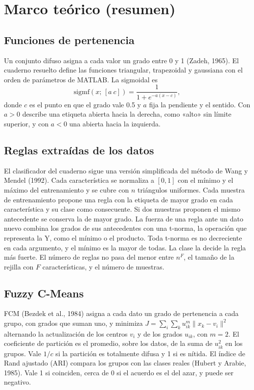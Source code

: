 \documentclass[11pt,letterpaper]{article}
\begin{document}
\section{Marco teórico (resumen)}

\subsection{Funciones de pertenencia}

Un conjunto difuso asigna a cada valor un grado entre 0 y 1 (Zadeh, 1965). El cuaderno resuelto define las funciones triangular, trapezoidal y gaussiana con el orden de parámetros de MATLAB. La sigmoidal es
\[
\mathrm{sigmf}(x;\,[a\ c]) = \frac{1}{1 + e^{-a(x-c)}},
\]
donde $c$ es el punto en que el grado vale 0.5 y $a$ fija la pendiente y el sentido. Con $a>0$ describe una etiqueta abierta hacia la derecha, como «alto» sin límite superior, y con $a<0$ una abierta hacia la izquierda.

\subsection{Reglas extraídas de los datos}

El clasificador del cuaderno sigue una versión simplificada del método de Wang y Mendel (1992). Cada característica se normaliza a $[0,1]$ con el mínimo y el máximo del entrenamiento y se cubre con $n$ triángulos uniformes. Cada muestra de entrenamiento propone una regla con la etiqueta de mayor grado en cada característica y su clase como consecuente. Si dos muestras proponen el mismo antecedente se conserva la de mayor grado. La fuerza de una regla ante un dato nuevo combina los grados de sus antecedentes con una t-norma, la operación que representa la Y, como el mínimo o el producto. Toda t-norma es no decreciente en cada argumento, y el mínimo es la mayor de todas. La clase la decide la regla más fuerte. El número de reglas no pasa del menor entre $n^F$, el tamaño de la rejilla con $F$ características, y el número de muestras.

\subsection{Fuzzy C-Means}

FCM (Bezdek et al., 1984) asigna a cada dato un grado de pertenencia a cada grupo, con grados que suman uno, y minimiza $J=\sum_i\sum_k u_{ik}^m\lVert x_k - v_i\rVert^2$ alternando la actualización de los centros $v_i$ y de los grados $u_{ik}$, con $m=2$. El coeficiente de partición es el promedio, sobre los datos, de la suma de $u_{ik}^2$ en los grupos. Vale $1/c$ si la partición es totalmente difusa y 1 si es nítida. El índice de Rand ajustado (ARI) compara los grupos con las clases reales (Hubert y Arabie, 1985). Vale 1 si coinciden, cerca de 0 si el acuerdo es el del azar, y puede ser negativo.
\end{document}
